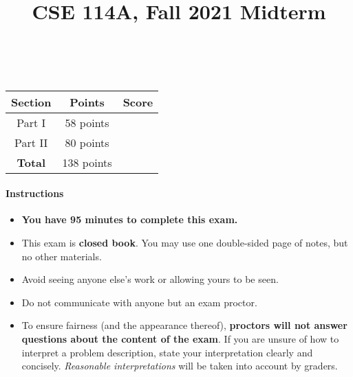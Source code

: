 \documentclass[paper=letter, fontsize=13pt]{article} %
\title{\vspace{-2em} 	
\normalfont \normalsize 
{\huge CSE 114A, Fall 2021 Midterm} \\ %
\horrule{2pt} \\[0.5cm] %
}
\date{\vspace{-4em}} %
\numberwithin{equation}{section} %
\begin{document}
\maketitle %


\begin{center}
 {\Large
\begin{tabular}{|c|c|c|}
\hline
\textbf{Section} & \textbf{Points} & \textbf{Score} \\
\hline
Part I     & 58 points  & \\
\hline
Part II   &  80 points &   \\
\hline
 \textbf{Total} & 138 points &   \\
\hline
\end{tabular}
}

\end{center}
\large 


\paragraph{\textbf{ Instructions} }
\begin{itemize}

\item \textbf{You have 95 minutes to complete this exam.}

\item This exam is \textbf{closed book}.  You may use one double-sided
page of notes, but no other materials.

\item Avoid seeing anyone else's work or allowing yours to be seen.

\item Do not communicate with anyone but an exam proctor.

\item To ensure fairness (and the appearance thereof),
  \textbf{proctors will not answer questions about the content of the exam}. If you are unsure 
  of how to interpret a problem description, state your interpretation clearly and concisely. 
  \textit{Reasonable interpretations} will be taken into account by graders.

\end{itemize}
\end{document}
